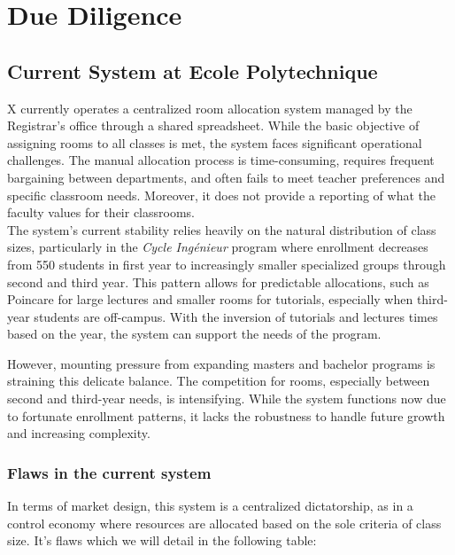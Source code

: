 \documentclass[a4paper, oneside]{article}
\theoremstyle{plain}
\begin{document}
\section{Due Diligence}
\subsection{Current System at Ecole Polytechnique}
X currently operates a centralized room allocation system managed by the Registrar's office through a shared spreadsheet.
While the basic objective of assigning rooms to all classes is met, the system faces significant operational challenges.
The manual allocation process is time-consuming, requires frequent bargaining between departments, and often fails to meet teacher preferences and specific classroom needs.
Moreover, it does not provide a reporting of what the faculty values for their classrooms.\\

The system's current stability relies heavily on the natural distribution of class sizes, particularly in the \textit{Cycle Ingénieur} program where enrollment decreases
from 550 students in first year to increasingly smaller specialized groups through second and third year. This pattern allows for predictable allocations, such as Poincare for large
lectures and smaller rooms for tutorials, especially when third-year students are off-campus. With the inversion of tutorials and lectures times based on the year, the system can support
the needs of the program.

However, mounting pressure from expanding masters and bachelor programs is straining this delicate balance. The competition for rooms,
especially between second and third-year needs, is intensifying. While the system functions now due to fortunate enrollment patterns,
it lacks the robustness to handle future growth and increasing complexity.

\subsubsection{Flaws in the current system}
In terms of market design, this system is a centralized dictatorship, as in a control economy where resources are allocated based on the sole criteria of class size. It's flaws which we will detail in the following table:\\
\end{document}
